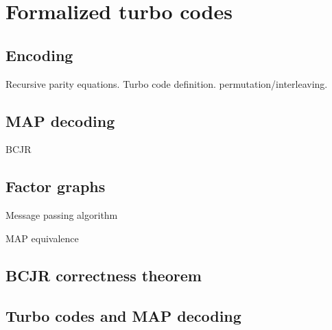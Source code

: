 \chapter{Formalized turbo codes}

\section{Encoding}

Recursive parity equations. Turbo code definition. permutation/interleaving.

\section{MAP decoding}

BCJR

\section{Factor graphs}

Message passing algorithm

MAP equivalence

\section{BCJR correctness theorem}

\section{Turbo codes and MAP decoding}